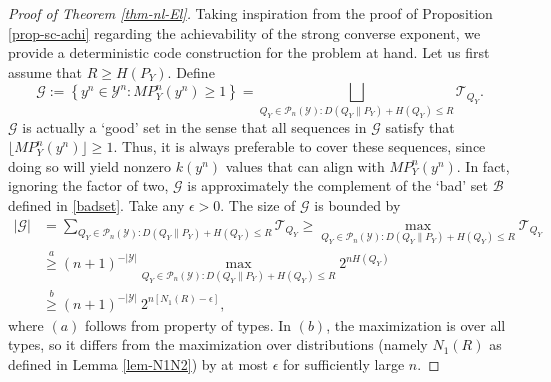\documentclass[10pt,a4paper]{amsart}
\newcommand{\carY}{|\mY|}
\newcommand{\mB}{\mathcal{B}}
\newcommand{\mG}{\mathcal{G}}
\newcommand{\mP}{\mathcal{P}}
\newcommand{\mT}{\mathcal{T}}
\newcommand{\mY}{\mathcal{Y}}
\begin{document}
\begin{proof}[Proof of Theorem \ref{thm-nl-El}]
Taking inspiration from the proof of Proposition \ref{prop-sc-achi} regarding the achievability of the strong converse exponent, we provide a deterministic code construction for the problem at hand. 
Let us first assume that $R\geq H(P_Y)$. Define
\begin{equation}\label{goodset}
    \mG := \left\{ y^n\in\mY^n: MP_Y^n(y^n)\geq1 \right\}
    = \bigsqcup_{Q_Y\in\mP_n(\mY): D(Q_Y\|P_Y) + H(Q_Y)\leq R} \mT_{Q_Y}.
\end{equation}
$\mG$ is actually a `good' set in the sense that all sequences in $\mG$ satisfy that $\lfloor MP_Y^n(y^n)\rfloor\geq1$. Thus, it is always preferable to cover these sequences, since doing so will yield nonzero $k(y^n)$ values that can align with $MP_Y^n(y^n)$. In fact, ignoring the factor of two, $\mG$ is approximately the complement of the `bad' set $\mB$ defined in \eqref{badset}. Take any $\epsilon>0$. The size of $\mG$ is bounded by
\begin{align*}
    |\mG| &= \sum_{Q_Y\in\mP_n(\mY): D(Q_Y\|P_Y) + H(Q_Y)\leq R} \mT_{Q_Y} 
    \geq \max_{Q_Y\in\mP_n(\mY): D(Q_Y\|P_Y) + H(Q_Y)\leq R} \mT_{Q_Y} \\
    &\overset{a}{\geq} (n+1)^{-\carY} \max_{Q_Y\in\mP_n(\mY): D(Q_Y\|P_Y) + H(Q_Y)\leq R} 2^{nH(Q_Y)} \\
    &\overset{b}{\geq} (n+1)^{-\carY} \ 2^{n \left[N_1(R)-\epsilon\right]},
\end{align*}
where $(a)$ follows from property of types. In $(b)$, the maximization is over all types, so it differs from the maximization over distributions (namely $N_1(R)$ as defined in Lemma \ref{lem-N1N2}) by at most $\epsilon$ for sufficiently large $n$.


\end{proof}
\end{document}
